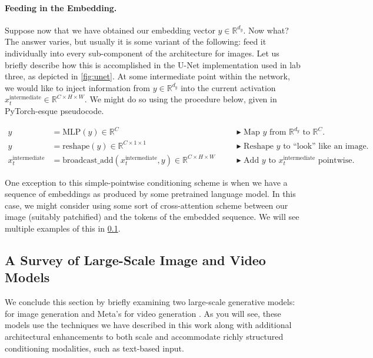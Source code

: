 \paragraph{Feeding in the Embedding.} Suppose now that we have obtained our embedding vector $y \in \mathbb{R}^{d_y}$. Now what? The answer varies, but usually it is some variant of the following: feed it individually into every sub-component of the architecture for images. Let us briefly describe how this is accomplished in the U-Net implementation used in lab three, as depicted in \cref{fig:unet}. At some intermediate point within the network, we would like to inject information from $y \in \mathbb{R}^{d_y}$ into the current activation $x^{\text{intermediate}}_t \in \mathbb{R}^{C \times H \times W}$. We might do so using the procedure below, given in PyTorch-esque pseudocode.

\begin{align*}
    y &= \text{MLP}(y) \in \mathbb{R}^C\quad 
    && \blacktriangleright\,\,\text{Map $y$ from $\mathbb{R}^{d_y}$ to $\mathbb{R}^C$.}\\
    y &= \text{reshape}(y) \in \mathbb{R}^{C \times 1 \times 1}\quad 
    && \blacktriangleright\,\,\text{Reshape $y$ to ``look'' like an image.}\\
    x^{\text{intermediate}}_t &= \text{broadcast\_add}(x^{\text{intermediate}}_t,y) \in \mathbb{R}^{C \times H \times W}\quad && \blacktriangleright\,\,\text{Add $y$ to $x^{\text{intermediate}}_t$ pointwise.}
\end{align*}

One exception to this simple-pointwise conditioning scheme is when we have a sequence of embeddings as produced by some pretrained language model. In this case, we might consider using some sort of cross-attention scheme between our image (suitably patchified) and the tokens of the embedded sequence. We will see multiple examples of this in \cref{sec:large_scale_models}.

\subsection{A Survey of Large-Scale Image and Video Models}
\label{sec:large_scale_models}
We conclude this section by briefly examining two large-scale generative models:  for image generation and Meta's  for video generation \citep{sd3, moviegen}. As you will see, these models use the techniques we have described in this work along with additional architectural enhancements to both scale and accommodate richly structured conditioning modalities, such as text-based input.


